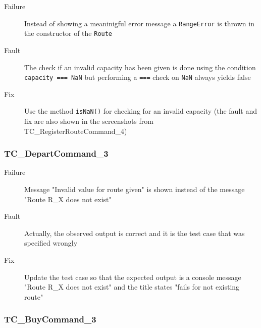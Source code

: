 \documentclass[11pt]{article}
\begin{document}
\begin{description}
\item[{Failure}] Instead of showing a meaninigful error message a \texttt{RangeError} is thrown in the constructor of the \texttt{Route}
\item[{Fault}] The check if an invalid capacity has been given is done using the condition \texttt{capacity === NaN} but performing a \texttt{===} check on \texttt{NaN} always yields false
\item[{Fix}] Use the method \texttt{isNaN()} for checking for an invalid capacity (the fault and fix are also shown in the screenshots from TC\_RegisterRouteCommand\_4)
\end{description}

\subsubsection{TC\_DepartCommand\_3}
\label{sec:org27afb42}

\begin{description}
\item[{Failure}] Message "Invalid value for route given" is shown instead of the message "Route R\_X does not exist"
\item[{Fault}] Actually, the observed output is correct and it is the test case that was specified wrongly
\item[{Fix}] Update the test case so that the expected output is a console message "Route R\_X does not exist" and the title states "fails for not existing route"
\end{description}

\subsubsection{TC\_BuyCommand\_3}
\label{sec:org800dbd0}
\end{document}
